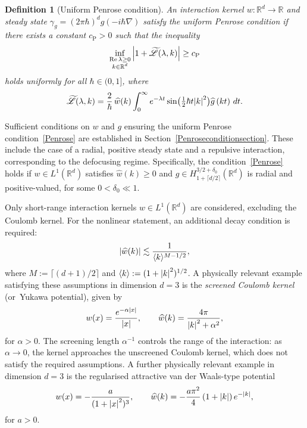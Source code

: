 \documentclass[11pt]{article}
\theoremstyle{plain}
\newtheorem{definition}[theorem]{Definition}
\theoremstyle{remark}
\newcommand{\br}[1]{\left(#1\right)}
\newcommand{\bbr}[1]{\bigl(#1 \bigr)}
\newcommand{\ak}{\abs{k}}
\newcommand{\jb}[1]{\langle#1\rangle}
\newcommand{\R}{\mathbb{R}}
\newcommand{\lam}{\lambda}
\begin{document}
\begin{definition}[Uniform Penrose condition]
An interaction kernel \(w\colon \R^d \to \R\) and steady state \(\gamma_g = (2\pi\hbar)^d g(-i\hbar\nabla)\) satisfy the uniform Penrose condition if there exists a constant \({c_{\mathrm{P}}} > 0\) such that the inequality
\begin{align}\label{Penrose}
\inf_{\substack{\Re\lambda \geq 0 \\ k \in \R^d}} \abs{1 + \widetilde{\mathscr{L}}(\lambda, k)} \geq {c_{\mathrm{P}}}
\end{align}
holds uniformly for all \(\hbar \in (0,1]\), where
\[
\widetilde{\mathscr{L}}(\lambda, k) = \frac{2}{\hbar}\, \widehat{w}(k) \int_0^\infty e^{-\lam t}\sin\bbr{\tfrac{1}{2}\hbar t \ak^2} \widehat{g}\br{kt}\,dt.
\]

\end{definition}
Sufficient conditions on $w$ and $g$ ensuring the uniform Penrose condition~\eqref{Penrose} are established in Section~\ref{Penroseconditionsection}. These include the case of a radial, positive steady state and a repulsive interaction, corresponding to the defocusing regime. Specifically, the condition~\eqref{Penrose} holds if \( w \in L^1(\R^d) \) satisfies \( \widehat{w}(k) \geq 0 \) and \( g \in H^{3/2+\delta_0}_{1+\lceil d/2 \rceil}(\R^d) \) is radial and positive-valued, for some \( 0 < \delta_0 \ll 1 \).

Only short-range interaction kernels \( w \in L^1(\R^d) \) are considered, excluding the Coulomb kernel. For the nonlinear statement, an additional decay condition is required:
\[
\abs{\widehat{w}(k)} \lesssim \frac{1}{\jb{k}^{M-1/2}},
\]
where \( M := \lceil (d+1)/2 \rceil \) and \( \jb{k} := (1 + \abs{k}^2)^{1/2} \). A physically relevant example satisfying these assumptions in dimension \( d = 3 \) is the \textit{screened Coulomb kernel} (or~Yukawa potential), given by
\[
w(x) = \frac{e^{-\alpha\abs{x}}}{\abs{x}}, \qquad \widehat{w}(k) = \frac{4\pi}{\abs{k}^2 + \alpha^2},
\]
for \( \alpha > 0 \). The screening length \( \alpha^{-1} \) controls the range of the interaction: as \( \alpha \to 0 \), the kernel approaches the unscreened Coulomb kernel, which does not satisfy the required assumptions. A further physically relevant example in dimension $d=3$ is the regularised attractive van der Waals-type potential
\[w(x)=-\frac{a}{(1+\abs{x}^2)^3},\qquad \widehat w(k)=-\frac{a\pi^2}{4}\br{1+\ak}e^{-\ak},\]
for $a>0$.
\end{document}
